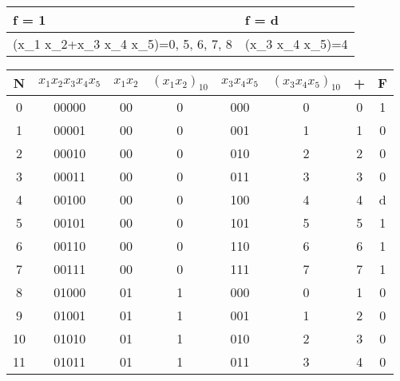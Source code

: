 \begin{table}[h!]
  \centering
  \begin{tabular}{|L|L|}
    \hline
     f = 1 &  f = d \\ \hline
    (x_1 x_2+x_3 x_4 x_5)=0, 5, 6, 7, 8 &  (x_3 x_4 x_5)=4 \\ \hline
  \end{tabular}
\end{table}

\begin{table}[h!]
  \centering
  \begin{tabular}{|c|c|c|c|c|c|c|c|}
  \hline
  N  & $x_1 x_2 x_3 x_4 x_5$ & $x_1 x_2$ & $(x_1 x_2)_{10}$ & $x_3 x_4 x_5$ & $(x_3 x_4 x_5)_{10}$ & +  & F  \\ \hline
  0  & 00000                 & 00        & 0                & 000           & 0                   & 0  & 1  \\ \hline
  1  & 00001                 & 00        & 0                & 001           & 1                   & 1  & 0  \\ \hline
  2  & 00010                 & 00        & 0                & 010           & 2                   & 2  & 0  \\ \hline
  3  & 00011                 & 00        & 0                & 011           & 3                   & 3  & 0  \\ \hline
  4  & 00100                 & 00        & 0                & 100           & 4                   & 4  & d  \\ \hline
  5  & 00101                 & 00        & 0                & 101           & 5                   & 5  & 1  \\ \hline
  6  & 00110                 & 00        & 0                & 110           & 6                   & 6  & 1  \\ \hline
  7  & 00111                 & 00        & 0                & 111           & 7                   & 7  & 1  \\ \hline
  8  & 01000                 & 01        & 1                & 000           & 0                   & 1  & 0  \\ \hline
  9  & 01001                 & 01        & 1                & 001           & 1                   & 2  & 0  \\ \hline
  10 & 01010                 & 01        & 1                & 010           & 2                   & 3  & 0  \\ \hline
  11 & 01011                 & 01        & 1                & 011           & 3                   & 4  & 0  \\ \hline

\end{tabular}
\end{table}
